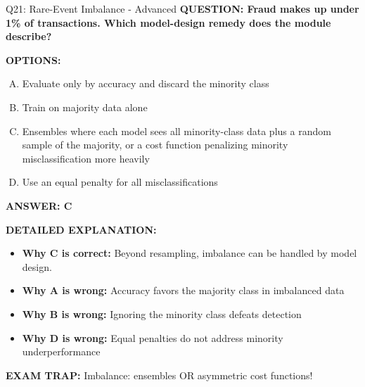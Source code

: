 \documentclass[8pt]{beamer}
\begin{document}
\begin{frame}[shrink=6]{Q21: Rare-Event Imbalance - Advanced}
\fontsize{6.5}{7.5}\selectfont
\textbf{QUESTION: Fraud makes up under 1\% of transactions. Which model-design remedy does the module describe?}

\vspace{0.1cm}
\textbf{OPTIONS:}
\begin{enumerate}[A.]
\item Evaluate only by accuracy and discard the minority class
\item Train on majority data alone
\item Ensembles where each model sees all minority-class data plus a random sample of the majority, or a cost function penalizing minority misclassification more heavily
\item Use an equal penalty for all misclassifications
\end{enumerate}

\vspace{0.1cm}
\textcolor{myblue}{\textbf{ANSWER: C}}

\vspace{0.1cm}
\textbf{DETAILED EXPLANATION:}
\begin{itemize}
\item \textbf{Why C is correct:} Beyond resampling, imbalance can be handled by model design.
\item \textbf{Why A is wrong:} Accuracy favors the majority class in imbalanced data
\item \textbf{Why B is wrong:} Ignoring the minority class defeats detection
\item \textbf{Why D is wrong:} Equal penalties do not address minority underperformance
\end{itemize}

\textcolor{myred}{\textbf{EXAM TRAP:}} Imbalance: ensembles OR asymmetric cost functions!
\end{frame}
\end{document}

